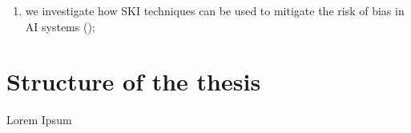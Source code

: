 \begin{refsection}
\begin{enumerate}[label=\emph{(\roman*)}]
    \begin{enumerate}[label=\emph{(\arabic*)},resume]
        \item we investigate how \ac{SKI} techniques can be used to mitigate the risk of bias in \ac{AI} systems ();
    \end{enumerate}
\end{enumerate}


\section{Structure of the thesis}
\label{sec:structure-of-the-thesis}
%
Lorem Ipsum

\printbibliography[title=Reference,heading=bibintoc]

\end{refsection}